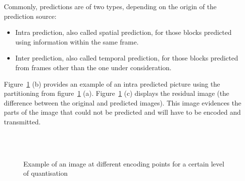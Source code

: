 \documentclass[11pt,a4paper,openright,twoside]{book}
\numberwithin{equation}{section} %
\numberwithin{figure}{section} %
\numberwithin{table}{section} %
\begin{document}
Commonly, predictions are of two types, depending on the origin of
the prediction source:
\begin{itemize}
	\item Intra prediction, also called spatial prediction, for those blocks
		predicted using information within the same frame.
	\item Inter prediction, also called temporal prediction, for those blocks
		predicted from frames other than the one under consideration.
\end{itemize}

Figure~\ref{fig:part_orig_pred_res_image} (b) provides an example of an intra
predicted picture using the partitioning from
figure~\ref{fig:part_orig_pred_res_image} (a).
Figure~\ref{fig:part_orig_pred_res_image} (c) displays the residual image (the
difference between the original and predicted images).
This image evidences the parts of the image that could not be predicted and
will have to be encoded and transmitted.

\begin{figure}[tb]
	\centering
	\\
	\\
	\caption{Example of an image at different encoding points for a
	certain level of quantisation}
	\label{fig:part_orig_pred_res_image}
\end{figure}
\end{document}
